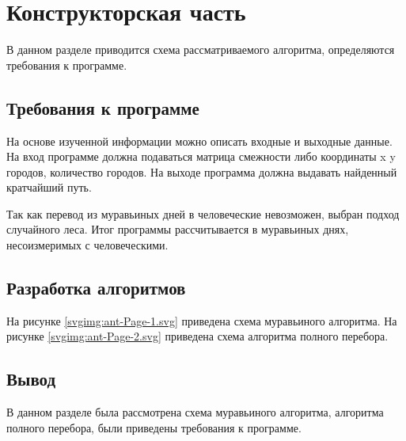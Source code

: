 \chapter{Конструкторская часть}
В данном разделе приводится схема рассматриваемого алгоритма, определяются требования к программе.

\section{Требования к программе}

На основе изученной информации можно описать входные и выходные данные.
На вход программе должна подаваться матрица смежности либо координаты x y городов, количество городов.
На выходе программа должна выдавать найденный кратчайший путь.


Так как перевод из муравьиных дней в человеческие невозможен, выбран подход случайного леса.
Итог программы рассчитывается в муравьиных днях, несоизмеримых с человеческими. 

\section{Разработка алгоритмов}

На рисунке \ref{svgimg:ant-Page-1.svg} приведена схема муравьиного алгоритма.
На рисунке \ref{svgimg:ant-Page-2.svg} приведена схема алгоритма полного перебора.

\newpage
{}
\newpage
{}
\newpage

\section*{Вывод}
В данном разделе была рассмотрена схема муравьиного алгоритма, алгоритма полного перебора, были приведены требования к программе.

